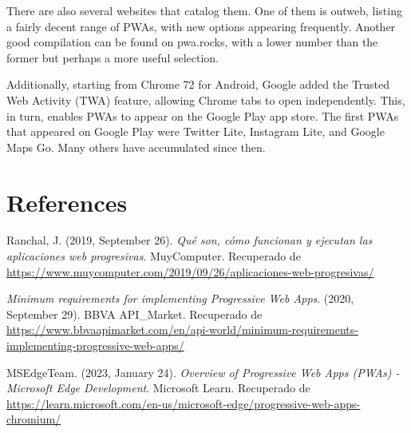 \documentclass[conference]{IEEEtran}
\begin{document}
There are also several websites that catalog them. One of them is outweb, listing a fairly decent range of PWAs, with new options appearing frequently. Another good compilation can be found on pwa.rocks, with a lower number than the former but perhaps a more useful selection.

Additionally, starting from Chrome 72 for Android, Google added the Trusted Web Activity (TWA) feature, allowing Chrome tabs to open independently. This, in turn, enables PWAs to appear on the Google Play app store. The first PWAs that appeared on Google Play were Twitter Lite, Instagram Lite, and Google Maps Go. Many others have accumulated since then.

\section{References}

\begin{thebibliography}{99}
    
Ranchal, J. (2019, September 26). \textit{Qué son, cómo funcionan y ejecutan las aplicaciones web progresivas}. MuyComputer. Recuperado de \url{https://www.muycomputer.com/2019/09/26/aplicaciones-web-progresivas/}

\textit{Minimum requirements for implementing Progressive Web Apps}. (2020, September 29). BBVA API\_Market. Recuperado de \url{https://www.bbvaapimarket.com/en/api-world/minimum-requirements-implementing-progressive-web-apps/}

MSEdgeTeam. (2023, January 24). \textit{Overview of Progressive Web Apps (PWAs) - Microsoft Edge Development}. Microsoft Learn. Recuperado de \url{https://learn.microsoft.com/en-us/microsoft-edge/progressive-web-apps-chromium/}

\end{thebibliography}
\end{document}
